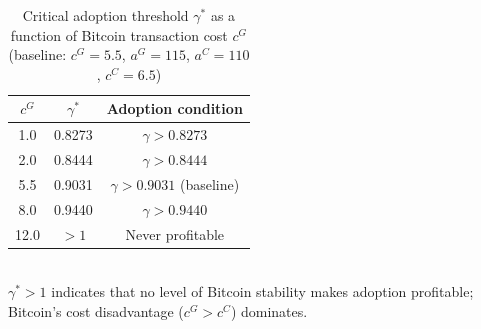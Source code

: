 \begin{table}[h]
\centering
\caption{Critical adoption threshold $\gamma^*$ as a function of Bitcoin
transaction cost $c^G$ (baseline: $c^G = 5.5$, $a^G = 115$, $a^C = 110$,
$c^C = 6.5$)}
\label{tab:sensitivity}
\begin{tabular}{ccc}
\toprule
$c^G$ & $\gamma^*$ & Adoption condition \\
\midrule
1.0  & 0.8273 & $\gamma > 0.8273$ \\
2.0  & 0.8444 & $\gamma > 0.8444$ \\
5.5  & 0.9031 & $\gamma > 0.9031$ \quad (baseline) \\
8.0  & 0.9440 & $\gamma > 0.9440$ \\
12.0 & $>1$   & Never profitable \\
\bottomrule
\end{tabular}
\smallskip\\
{\small $\gamma^* > 1$ indicates that no level of Bitcoin stability makes
adoption profitable; Bitcoin's cost disadvantage ($c^G > c^C$) dominates.}
\end{table}
